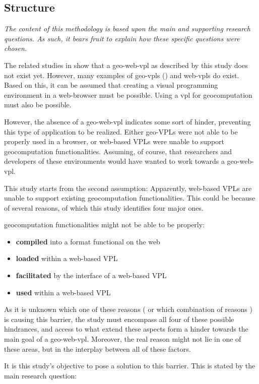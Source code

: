 \subsection*{Structure}
  
\emph{The content of this methodology is based upon the main and supporting research questions. 
As such, it bears fruit to explain how these specific questions were chosen.}

The related studies in  show that a \ac{geo-web-vpl} as described by this study does not exist yet. However, many examples of geo-vpls () and web-vpls  do exist. 
Based on this, it can be assumed that creating a visual programming environment in a web-browser must be possible. 
Using a \ac*{vpl} for geocomputation must also be possible. 

However, the absence of a geo-web-vpl indicates some sort of hinder, preventing this type of application to be realized. Either geo-VPLs were not able to be properly used in a browser, or web-based VPLs were unable to support geocomputation functionalities. 
Assuming, of course, that researchers and developers of these environments would have wanted to work towards a \ac{geo-web-vpl}.

This study starts from the second assumption: 
Apparently, web-based VPLs are unable to support existing geocomputation functionalities. 
This could be because of several reasons, of which this study identifies four major ones.

geocomputation functionalities might not be able to be properly:
\begin{itemize}[-]
  \item \textbf{compiled} into a format functional on the web
  \item \textbf{loaded} within a web-based VPL
  \item \textbf{facilitated} by the interface of a web-based VPL
  \item \textbf{used} within a web-based VPL
\end{itemize}
As it is unknown which one of these reasons ( or which combination of reasons ) is causing this barrier, the study must encompass all four of these possible hindrances, and access to what extend these aspects form a hinder towards the main goal of a \ac{geo-web-vpl}. 
Moreover, the real reason might not lie in one of these areas, but in the interplay between all of these factors. 

It is this study's objective to pose a solution to this barrier. This is stated by the main research question: \myMainRQ 

